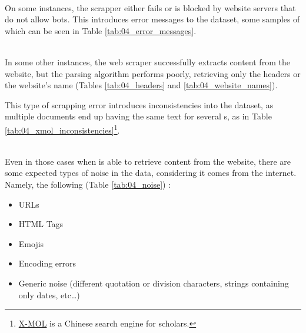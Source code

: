 \label{vsi_issues_error_messages}
\ \\

On some instances, the \trafilatura{} scrapper either fails or is blocked by website servers that do not allow bots. This introduces error messages to the dataset, some samples of which can be seen in Table \ref{tab:04_error_messages}.





\label{vsi_issues_scrapping_errors}
\ \\

In some other instances, the web scraper successfully extracts content from the website, but the parsing algorithm performs poorly, retrieving only the headers or the website's name (Tables \ref{tab:04_headers} and \ref{tab:04_website_names}).



This type of scrapping error introduces inconsistencies into the \VSI{} dataset, as multiple documents end up having the same text for several \contentType{}s, as in Table \ref{tab:04_xmol_inconsistencies}\footnote{\href{https://www.x-mol.com/}{X-MOL} is a Chinese search engine for scholars.}.










\label{vsi_issues_data_noise}
\ \\

Even in those cases when \trafilatura{} is able to retrieve content from the website, there are some expected types of noise in the data, considering it comes from the internet.
Namely, the following  (Table \ref{tab:04_noise}) :
\begin{itemize}
    \item URLs
    \item HTML Tags
    \item Emojis
    \item Encoding errors
    \item Generic noise (different quotation or division characters, strings containing only dates, etc\ldots)
\end{itemize}




